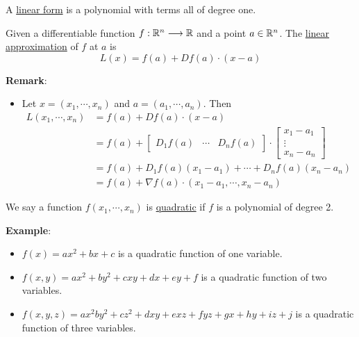\begin{definition}
    A \underline{linear form} is a polynomial with terms all of degree one.
\end{definition}

\begin{definition}
    Given a differentiable function $f:\mathbb{R}^n\longrightarrow \mathbb{R}$ and a point $a\in \mathbb{R}^n$. The \underline{linear approximation} of $f$ at $a$ is
    $$L(x)=f(a)+Df(a)\cdot (x-a)$$
\end{definition}
\noindent \textbf{Remark}:
\begin{itemize}
    \item Let $x=(x_1,\cdots,x_n)$ and $a=(a_1,\cdots,a_n)$. Then 
    \begin{equation}
        \begin{split}
            L(x_1,\cdots,x_n)&=f(a)+Df(a)\cdot (x-a)\\
            &= f(a)+ \begin{bmatrix}
                D_1f(a) & \cdots & D_nf(a)
            \end{bmatrix}\cdot \begin{bmatrix}
                x_1-a_1\\
                \vdots\\
                x_n-a_n
            \end{bmatrix}\\
            &= f(a)+ D_1f(a)(x_1-a_1)+\cdots+D_nf(a)(x_n-a_n)\\
            &= f(a)+ \nabla f(a)\cdot (x_1-a_1,\cdots,x_n-a_n)
        \end{split}
    \end{equation}
\end{itemize}

\begin{definition}
    We say a function $f(x_1,\cdots,x_n)$ is \underline{quadratic} if $f$ is a polynomial of degree 2.
\end{definition}
\noindent \textbf{Example}:
\begin{itemize}
    \item $f(x)=ax^2+bx+c$ is a quadratic function of one variable.
    \item $f(x,y)=ax^2+by^2+cxy+dx+ey+f$ is a quadratic function of two variables.
    \item $f(x,y,z)=ax^2by^2+cz^2+dxy+exz+fyz+gx+hy+iz+j$ is a quadratic function of three variables.
\end{itemize}

